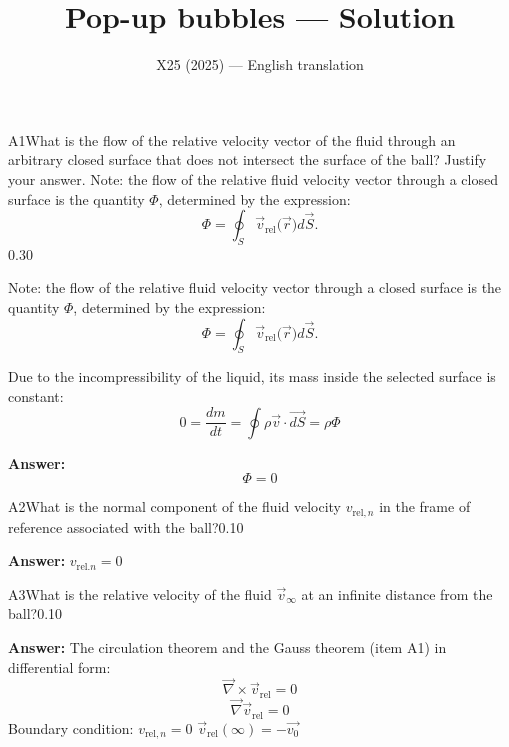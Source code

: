 \documentclass[11pt,a4paper]{article}
\title{\textbf{Pop-up bubbles --- Solution}}
\author{\normalsize X25 (2025) — English translation}
\date{}
\begin{document}
\maketitle\vspace{-0.5em}
\begin{solcard}{A1}{What is the flow of the relative velocity vector of the fluid through an arbitrary closed surface that does not intersect the surface of the ball? Justify your answer. Note: the flow of the relative fluid velocity vector through a closed surface is the quantity $\Phi$, determined by the expression: \begin{equation*} \Phi=\oint_S\vec{v}_\text{rel}\bigl(\vec{r}\bigr)d\vec{S}{.} \end{equation*}}{0.30}

Note: the flow of the relative fluid velocity vector through a closed surface is the quantity $\Phi$, determined by the expression: \begin{equation*} \Phi=\oint_S\vec{v}_\text{rel}\bigl(\vec{r}\bigr)d\vec{S}{.} \end{equation*}


Due to the incompressibility of the liquid, its mass inside the selected surface is constant: $$0 = \frac{dm}{dt} = \displaystyle\oint \rho \vec{v}\cdot\vec{dS} = \rho \Phi$$

\par\smallskip\noindent\textbf{Answer:} $$\Phi = 0$$
\end{solcard}

\begin{solcard}{A2}{What is the normal component of the fluid velocity ${v}_{\text{rel},n}$ in the frame of reference associated with the ball?}{0.10}
\par\smallskip\noindent\textbf{Answer:} $v_{\text{rel}.n} = 0$
\end{solcard}

\begin{solcard}{A3}{What is the relative velocity of the fluid $\vec{v}_{\infty}$ at an infinite distance from the ball?}{0.10}
\par\smallskip\noindent\textbf{Answer:} The circulation theorem and the Gauss theorem (item A1) in differential form: $$\vec{\nabla} \times \vec{v}_{\text{rel}} = 0$$$$\vec{\nabla} \vec{v}_{\text{rel}} = 0$$Boundary condition: $v_{\text{rel},n} = 0$ $\vec{v}_{\text{rel}} (\infty) = -\vec{v_0}$
\end{solcard}
\end{document}
